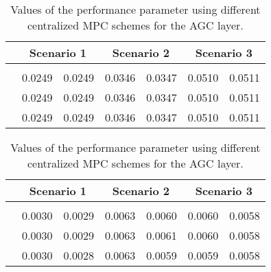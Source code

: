 \documentclass[a4paper]{article}
\begin{document}
          \begin{table}[!ht]
            \centering
            \begin{tabular}{|c||c|c||c|c||c|c|}
              \hline
                                     & \multicolumn{2}{|c||}{Scenario 1} & \multicolumn{2}{|c||}{Scenario 2} & \multicolumn{2}{|c|}{Scenario 3} \\
              \hline
                                     &                      &           &                     &           &                    &            \\
              \hline
                    &       0.0249           &   0.0249        &    0.0346            &   0.0347        &    0.0510           &      0.0511       \\
              \hline
                   &      0.0249            &    0.0249      &     0.0346            &   0.0347        &    0.0510           &    0.0511         \\
              \hline
                   &       0.0249           &   0.0249       &    0.0346             &   0.0347        &   0.0510            &   0.0511            \\
              \hline
            \end{tabular}
            \caption{Values of the performance parameter  using different centralized MPC schemes for the AGC layer.}
            \label{tab:simulationsEta}
          \end{table}

          \begin{table}[!ht]
            \centering
            \begin{tabular}{|c||c|c||c|c||c|c|}
              \hline
                                     & \multicolumn{2}{|c||}{Scenario 1} & \multicolumn{2}{|c||}{Scenario 2} & \multicolumn{2}{|c|}{Scenario 3} \\
              \hline
                                     &                      &           &                     &           &                    &            \\
              \hline
                     &        0.0030         &   0.0029       &    0.0063              &     0.0060     &      0.0060          &   0.0058         \\
              \hline
                   &       0.0030          &   0.0029        &   0.0063              &   0.0061        &   0.0060             &    0.0058        \\
              \hline
                   &    0.0030            &     0.0028       &    0.0063              &  0.0059        &  0.0059              &   0.0058          \\
              \hline
            \end{tabular}
            \caption{Values of the performance parameter  using different centralized MPC schemes for the AGC layer.}
            \label{tab:simulationsPhi}
          \end{table}
\end{document}
